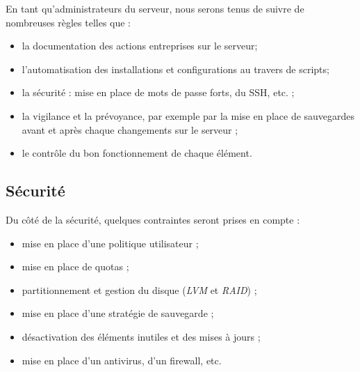 En tant qu'administrateurs du serveur, nous serons tenus de suivre de nombreuses
règles telles que :

\begin{itemize}
\item la documentation des actions entreprises sur le serveur;
\item l'automatisation des installations et configurations au travers de scripts;
\item la sécurité : mise en place de mots de passe forts, du SSH, etc. ;
\item la vigilance et la prévoyance, par exemple par la mise en place de
  sauvegardes avant et après chaque changements sur le serveur ;
\item le contrôle du bon fonctionnement de chaque élément.
\end{itemize}

\subsection{Sécurité}
\label{subsec:securite}

Du côté de la sécurité, quelques contraintes seront prises en compte :

\begin{itemize}
\item mise en place d'une politique utilisateur ;
\item mise en place de quotas ;
\item partitionnement et gestion du disque (\emph{LVM} et
  \emph{RAID}) ;
\item mise en place d'une stratégie de sauvegarde ;
\item désactivation des éléments inutiles et des mises à jours ;
\item mise en place d'un antivirus, d'un firewall, etc.
\end{itemize}

